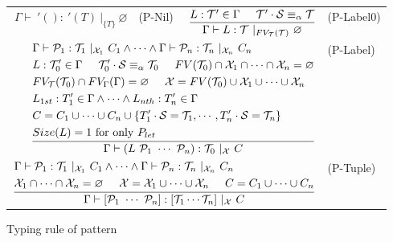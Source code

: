 \documentclass{article}
\begin{document}
\begin{figure}[tb]
    \centering
    \begin{tabular}{rlrl}
        $\Gamma \vdash\ '() :\ '(T)\ |_{\{T\}}\ \varnothing$ & (P-Nil) &
        $\dfrac{L : \mathcal{T}' \in \Gamma \hspace{5mm} \mathcal{T}' \cdot \mathcal{S} \equiv_\alpha \mathcal{T}}{\Gamma \vdash L : \mathcal{T}\ |_{FV_\mathcal{T}(\mathcal{T})}\ \varnothing}$ & (P-Label0) \vspace{5mm} \\

        \multicolumn{3}{r}{
        $\dfrac{
            \begin{aligned}
                &\Gamma \vdash \mathcal{P}_1 : \mathcal{T}_1\ |_{\mathcal{X}_1}\ C_1 \land \cdots \land
                    \Gamma \vdash \mathcal{P}_n : \mathcal{T}_n\ |_{\mathcal{X}_n}\ C_n \\
                &L : \mathcal{T}_0' \in \Gamma \hspace{5mm} \mathcal{T}_0' \cdot \mathcal{S}\equiv_\alpha \mathcal{T}_0 \hspace{5mm} FV(\mathcal{T}_0) \cap \mathcal{X}_1 \cap \cdots \cap \mathcal{X}_n = \varnothing \\
                &FV_\mathcal{T}(\mathcal{T}_0) \cap FV_\Gamma(\Gamma) = \varnothing \hspace{5mm}
                    \mathcal{X} = FV(\mathcal{T}_0) \cup \mathcal{X}_1 \cup \cdots \cup \mathcal{X}_n \\
                &L_{1st} : T_1' \in \Gamma \land \cdots \land L_{nth} : T_n' \in \Gamma \\
                &C = C_1 \cup \cdots \cup C_n \cup \{T_1' \cdot \mathcal{S} = \mathcal{T}_1, \cdots, T_n' \cdot \mathcal{S} = \mathcal{T}_n\} \\
                &Size(L) = 1\ \mbox{for only}\ P_{let}
            \end{aligned}
        }{
            \Gamma \vdash (L\ \mathcal{P}_1\ \cdots\ \mathcal{P}_n) : \mathcal{T}_0\ |_{\mathcal{X}}\ C
        }$} & (P-Label) \vspace{5mm} \\

        \multicolumn{3}{r}{
        $\dfrac{
            \begin{aligned}
                &\Gamma \vdash \mathcal{P}_1 : \mathcal{T}_1\ |_{\mathcal{X}_1}\ C_1 \land \cdots \land
                    \Gamma \vdash \mathcal{P}_n : \mathcal{T}_n\ |_{\mathcal{X}_n}\ C_n \\
                &\mathcal{X}_1 \cap \cdots \cap \mathcal{X}_n = \varnothing \hspace{5mm}
                    \mathcal{X} = \mathcal{X}_1 \cup \cdots \cup \mathcal{X}_n \hspace{5mm}
                    C = C_1 \cup \cdots \cup C_n
            \end{aligned}
        }{
            \Gamma \vdash [\mathcal{P}_1\ \cdots\ \mathcal{P}_n] : [\mathcal{T}_1 \cdots \mathcal{T}_n]\ |_{\mathcal{X}}\ C
        }$} & (P-Tuple) \\
    \end{tabular}
    \caption{Typing rule of pattern}
\end{figure}
\end{document}
